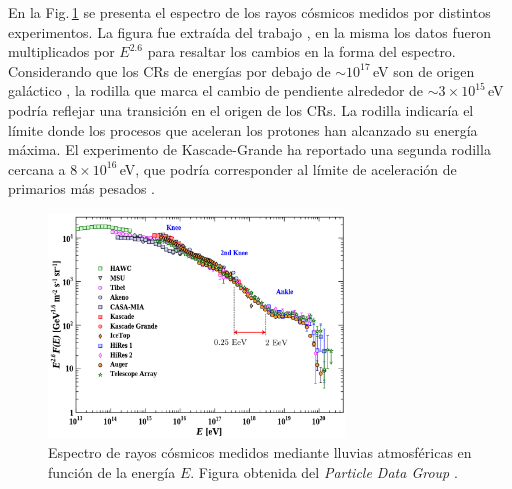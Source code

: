En la Fig.\,\ref{fig:spectra} se presenta el espectro de los rayos cósmicos medidos por distintos experimentos. La figura fue extraída del trabajo \cite{PGD}, en la misma los datos fueron multiplicados por $E^{2.6}$ para resaltar los cambios en la forma del espectro. Considerando que los CRs de energías por debajo de $\sim  10^{17}\,$eV son de origen galáctico \cite{taborda}, la rodilla que marca el cambio de pendiente alrededor de $\sim 3\times10^{15}\,$eV podría reflejar una transición en el origen de los CRs. La rodilla indicaría el límite donde los procesos que aceleran los protones han alcanzado su energía máxima. El experimento de Kascade-Grande ha reportado una segunda rodilla cercana a $8\times10^{16}\,$eV, que podría corresponder al límite de aceleración de primarios más pesados \cite{PGD}.

\begin{figure}[H]
	\centering
	\includegraphics[width=0.7\textwidth]{auger_spectrum_v3.png}
	\caption{Espectro de rayos cósmicos medidos mediante lluvias atmosféricas en función de la energía $E$. Figura obtenida del \emph{Particle Data Group} \cite{PGD}.}
	\label{fig:spectra}
\end{figure}


